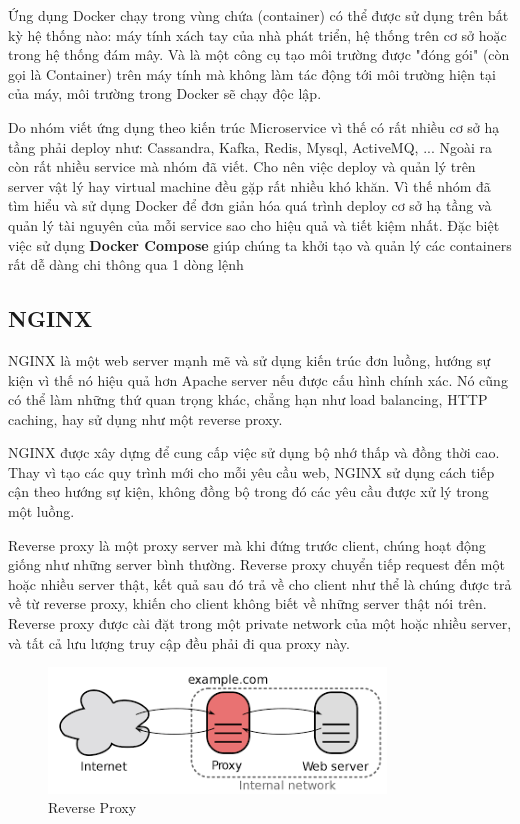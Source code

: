 \begin{itemize}
            Ứng dụng Docker chạy trong vùng chứa (container) có thể được sử dụng trên bất kỳ hệ thống nào: máy tính xách tay của nhà phát triển, hệ thống trên cơ sở hoặc trong hệ thống đám mây. Và là một công cụ tạo môi trường được "đóng gói" (còn gọi là Container) trên máy tính mà không làm tác động tới môi trường hiện tại của máy, môi trường trong Docker sẽ chạy độc lập.
            
            Do nhóm viết ứng dụng theo kiến trúc Microservice vì thế có rất nhiều cơ sở hạ tầng phải deploy như: Cassandra, Kafka, Redis, Mysql, ActiveMQ, ... Ngoài ra còn rất nhiều service mà nhóm đã viết. Cho nên việc deploy và quản lý trên server vật lý hay virtual machine đều gặp rất nhiều khó khăn. Vì thế nhóm đã tìm hiểu và sử dụng Docker để đơn giản hóa quá trình deploy cơ sở hạ tầng và quản lý tài nguyên của mỗi service sao cho hiệu quả và tiết kiệm nhất. Đặc biệt việc sử dụng \textbf{Docker Compose} giúp chúng ta khởi tạo và quản lý các containers rất dễ dàng chi thông qua 1 dòng lệnh
            
            
            \subsection{NGINX}
            
            NGINX là một web server mạnh mẽ và sử dụng kiến trúc đơn luồng, hướng sự kiện vì thế nó hiệu quả hơn Apache server nếu được cấu hình chính xác. Nó cũng có thể làm những thứ quan trọng khác, chẳng hạn như load balancing, HTTP caching, hay sử dụng như một reverse proxy.
            
            NGINX được xây dựng để cung cấp việc sử dụng bộ nhớ thấp và đồng thời cao. Thay vì tạo các quy trình mới cho mỗi yêu cầu web, NGINX sử dụng cách tiếp cận theo hướng sự kiện, không đồng bộ trong đó các yêu cầu được xử lý trong một luồng.
            
            Reverse proxy là một proxy server mà khi đứng trước client, chúng hoạt động giống như những server bình thường. Reverse proxy chuyển tiếp request đến một hoặc nhiều server thật, kết quả sau đó trả về cho client như thể là chúng được trả về từ reverse proxy, khiến cho client không biết về những server thật nói trên. Reverse proxy được cài đặt trong một private network của một hoặc nhiều server, và tất cả lưu lượng truy cập đều phải đi qua proxy này. 
            
             \begin{figure}[!ht]   			
             \includegraphics[width=0.8\textwidth]{Images/reverseproxy.png}
    		\centering
    		\linebreak
    		\caption{Reverse Proxy}
            \end{figure}
            

\end{itemize}
